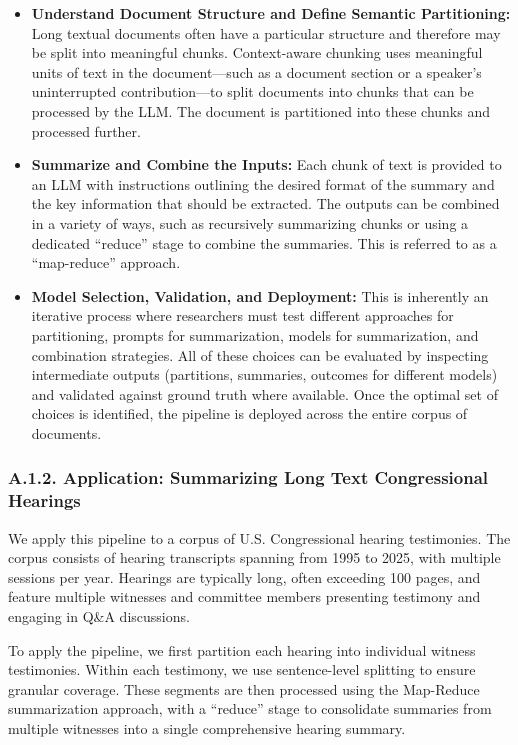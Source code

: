 \documentclass[11pt]{article}
\begin{document}
\begin{itemize}
    \item \textbf{Understand Document Structure and Define Semantic Partitioning:} Long textual documents often have a particular structure and therefore may be split into meaningful chunks. Context-aware chunking uses meaningful units of text in the document---such as a document section or a speaker's uninterrupted contribution---to split documents into chunks that can be processed by the LLM. The document is partitioned into these chunks and processed further.
    \item \textbf{Summarize and Combine the Inputs:} Each chunk of text is provided to an LLM with instructions outlining the desired format of the summary and the key information that should be extracted. The outputs can be combined in a variety of ways, such as recursively summarizing chunks or using a dedicated ``reduce'' stage to combine the summaries. This is referred to as a ``map-reduce'' approach.
    \item \textbf{Model Selection, Validation, and Deployment:} This is inherently an iterative process where researchers must test different approaches for partitioning, prompts for summarization, models for summarization, and combination strategies. All of these choices can be evaluated by inspecting intermediate outputs (partitions, summaries, outcomes for different models) and validated against ground truth where available. Once the optimal set of choices is identified, the pipeline is deployed across the entire corpus of documents.
\end{itemize}

\subsubsection*{A.1.2. Application: Summarizing Long Text Congressional Hearings}

We apply this pipeline to a corpus of U.S. Congressional hearing testimonies. The corpus consists of hearing transcripts spanning from 1995 to 2025, with multiple sessions per year. Hearings are typically long, often exceeding 100 pages, and feature multiple witnesses and committee members presenting testimony and engaging in Q\&A discussions.

To apply the pipeline, we first partition each hearing into individual witness testimonies. Within each testimony, we use sentence-level splitting to ensure granular coverage. These segments are then processed using the Map-Reduce summarization approach, with a ``reduce'' stage to consolidate summaries from multiple witnesses into a single comprehensive hearing summary.
\end{document}
